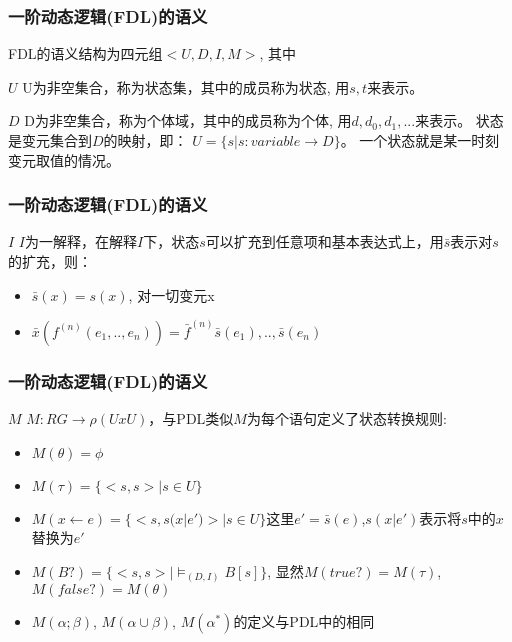 \documentclass{beamer}
\begin{document}
\begin{frame}
	\frametitle{一阶动态逻辑(FDL)的语义}
	FDL的语义结构为四元组$<U,D,I,M>$, 其中
	\begin{block}{$U$}
		U为非空集合，称为状态集，其中的成员称为状态, 用$s, t$来表示。
	\end{block}
	\begin{block}{$D$}
		D为非空集合，称为个体域，其中的成员称为个体, 用$d, d_0, d_1, ...$来表示。
		状态是变元集合到$D$的映射，即： $U = \{s| s:variable \rightarrow D \}$。
		一个状态就是某一时刻变元取值的情况。
	\end{block}
	
\end{frame}



\begin{frame}
	\frametitle{一阶动态逻辑(FDL)的语义}	
	\begin{block}{$I$}
		$I$为一解释，在解释$I$下，状态$s$可以扩充到任意项和基本表达式上，用$\bar{s}$表示对$s$的扩充，则：
		\begin{itemize}
			\item $\bar{s}(x) = s(x)$, 对一切变元x
			\item $\bar{x}(f^{(n)}(e_1,..,e_n)) = \bar{f} ^ {(n)} \bar{s}(e_1),..,\bar{s}(e_n)$
		\end{itemize}
	\end{block}
\end{frame}


\begin{frame}
	\frametitle{一阶动态逻辑(FDL)的语义}
	\begin{block}{$M$}
		$M: RG \rightarrow \rho (UxU) $，与PDL类似$M$为每个语句定义了状态转换规则:
		\begin{itemize}
			\item $M(\theta) = \phi$
			\item $M(\tau) = \{<s,s> | s \in U\}$
			\item $M(x \leftarrow e) = \{<s, s(x|e')> | s \in U \}$这里$e'=\bar{s}(e)$,$s(x|e')$表示将$s$中的$x$替换为$e'$
			\item $M(B?) = \{<s,s>|\models_{(D,I)} B[s]\}$, 显然$M(true?) = M(\tau)$, $M(false?) = M(\theta)$
			\item $M(\alpha ; \beta)$, $M(\alpha \cup \beta)$, $M(\alpha ^{*})$的定义与PDL中的相同
		\end{itemize}
	\end{block}
\end{frame}
\end{document}
